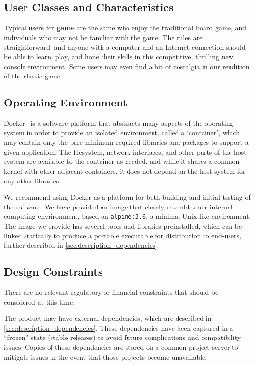 \documentclass[letterpaper]{article}
\begin{document}
\subsection{User Classes and Characteristics}
\label{sec:description_user}

Typical users for \textbf{game} are the same who enjoy the
traditional board game, and individuals who may not be familiar
with the game. The rules are straightforward, and anyone with a
computer and an Internet connection should be able to learn,
play, and hone their skills in this competitive, thrilling new
console environment. Some users may even find a bit of nostalgia
in our rendition of the classic game.

\subsection{Operating Environment}
\label{sec:description_environment}

Docker~\cite{docker} is a software platform that abstracts many
aspects of the operating system in order to provide an isolated
environment, called a `container', which may contain only the
bare minimum required libraries and packages to support a given
application. The filesystem, network interfaces, and other parts
of the host system are available to the container as needed, and
while it shares a common kernel with other adjacent containers,
it does not depend on the host system for any other libraries.

We recommend using Docker as a platform for both building and
initial testing of the software. We have provided an image that
closely resembles our internal computing envrironment, based on
\texttt{alpine:3.6}, a minimal Unix-like environment. The image
we provide has several tools and libraries preinstalled, which
can be linked statically to produce a portable executable for
distribution to end-users, further described in
\cref{sec:description_dependencies}.

\subsection{Design Constraints}
\label{sec:description_constraints}

There are no relevant regulatory or financial constraints that
should be considered at this time.

The product may have external dependencies, which are described
in \cref{sec:description_dependencies}. These dependencies have
been captured in a ``frozen'' state (stable releases) to avoid
future complications and compatibility issues. Copies of these
dependencies are stored on a common project server to mitigate
issues in the event that those projects become unavailable.
\end{document}
